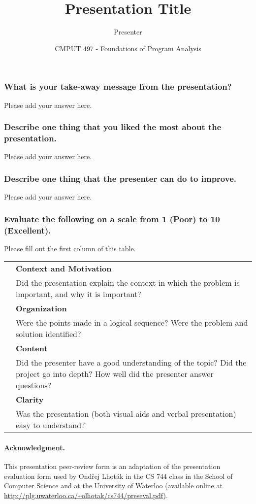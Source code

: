\documentclass{article}
\title{Presentation Title}
\author{Presenter}
\date{CMPUT 497 - Foundations of Program Analysis}
\begin{document}
\maketitle

\subsubsection*{What is your take-away message from the presentation?}
Please add your answer here.



\subsubsection*{Describe one thing that you liked the most about the presentation.}
Please add your answer here.



\subsubsection*{Describe one thing that the presenter can do to improve.}
Please add your answer here.


\subsubsection*{Evaluate the following on a scale from 1 (Poor) to 10 (Excellent).}
Please fill out the first column of this table.

\begin{table}[h]
\begin{tabularx}{\textwidth}{| p{1cm} | X |}
	\hline
	& \textbf{Context and Motivation} \\
	& Did the presentation explain the context in which the problem is important, and why it is important? \\ \hline
	& \textbf{Organization} \\ 
	& Were the points made in a logical sequence? Were the problem and solution identified? \\ \hline
	& \textbf{Content} \\ 
	& Did the presenter have a good understanding of the topic? Did the project go into depth? How well did the presenter answer questions? \\ \hline
	& \textbf{Clarity} \\ 
	& Was the presentation (both visual aids and verbal presentation) easy to understand? \\ \hline
\end{tabularx}
\end{table}

\paragraph{Acknowledgment.} This presentation peer-review form is an adaptation of the presentation evaluation form used by Ond\v{r}ej Lhot\'{a}k in the CS 744 class in the School of Computer Science and at the University of Waterloo (available online at \url{http://plg.uwaterloo.ca/~olhotak/cs744/preseval.pdf}).
\end{document}
